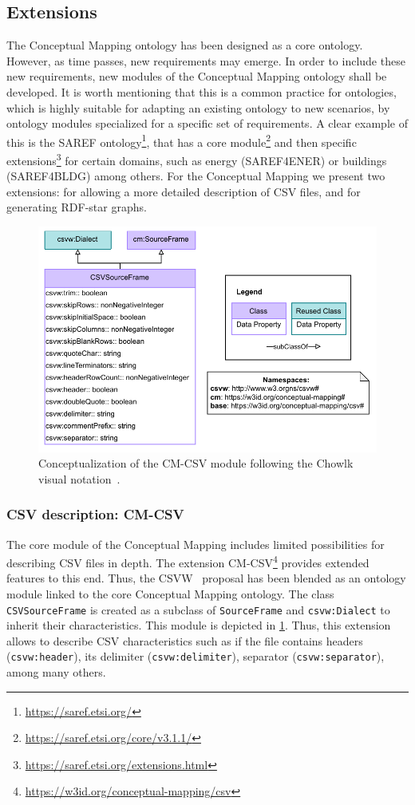 \subsection{Extensions}
\label{sec:chp4_cm-extensions}
The Conceptual Mapping ontology has been designed as a core ontology. However, as time passes, new requirements may emerge. In order to include these new requirements, new modules of the Conceptual Mapping ontology shall be developed. It is worth mentioning that this is a common practice for ontologies, which is highly suitable for adapting an existing ontology to new scenarios, by ontology modules specialized for a specific set of requirements. A clear example of this is the SAREF ontology\footnote{\url{https://saref.etsi.org/}}, that has a core module\footnote{\url{https://saref.etsi.org/core/v3.1.1/}} and then specific extensions\footnote{\url{https://saref.etsi.org/extensions.html}} for certain domains, such as energy (SAREF4ENER) or buildings (SAREF4BLDG) among others. For the Conceptual Mapping we present two extensions: for allowing a more detailed description of CSV files, and for generating RDF-star graphs.


\begin{figure}[!t]
\centering
\includegraphics[width=0.8\linewidth]{figures/chp4-2_cm-csv.pdf}
\caption[CM-CSV module]{Conceptualization of the CM-CSV module following the Chowlk visual notation~\parencite{feria2022chowlk}.}
\label{fig:chp4-2_cm-csv}
\end{figure}


\subsubsection{CSV description: CM-CSV}
The core module of the Conceptual Mapping includes limited possibilities for describing CSV files in depth. The extension CM-CSV\footnote{\url{https://w3id.org/conceptual-mapping/csv}} provides extended features to this end. Thus, the CSVW~\parencite{Tennison2015csvw} proposal has been blended as an ontology module linked to the core Conceptual Mapping ontology. The class \texttt{CSVSourceFrame} is created as a subclass of \texttt{SourceFrame} and \texttt{csvw:Dialect} to inherit their characteristics. This module is depicted in \cref{fig:chp4-2_cm-csv}. Thus, this extension allows to describe CSV characteristics such as if the file contains headers (\texttt{csvw:header}), its delimiter (\texttt{csvw:delimiter}), separator (\texttt{csvw:separator}), among many others. 

